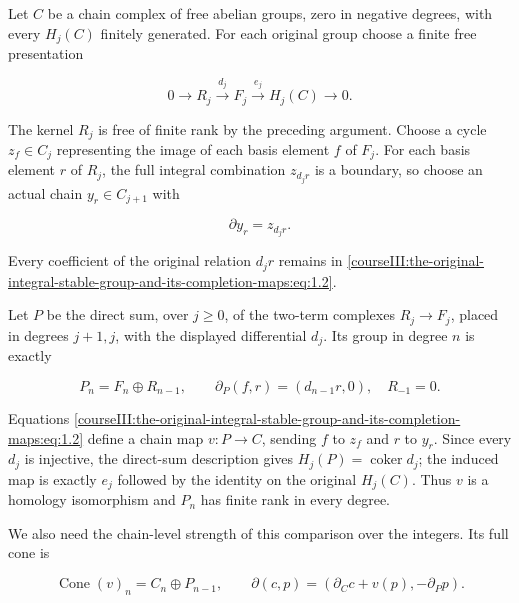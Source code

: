 Let \(C\) be a chain complex of free abelian groups, zero in negative degrees, with every \(H_j(C)\) finitely generated. For each original group choose a finite free presentation

\begin{equation}
0\longrightarrow R_j\xrightarrow{d_j}F_j
 \xrightarrow{e_j}H_j(C)\longrightarrow0.
 \label{courseIII:the-original-integral-stable-group-and-its-completion-maps:eq:1.1}
\end{equation}

The kernel \(R_j\) is free of finite rank by the preceding argument. Choose a cycle \(z_f\in C_j\) representing the image of each basis element \(f\) of \(F_j\). For each basis element \(r\) of \(R_j\), the full integral combination \(z_{d_jr}\) is a boundary, so choose an actual chain \(y_r\in C_{j+1}\) with

\begin{equation}
\partial y_r=z_{d_jr}.
 \label{courseIII:the-original-integral-stable-group-and-its-completion-maps:eq:1.2}
\end{equation}

Every coefficient of the original relation \(d_jr\) remains in \eqref{courseIII:the-original-integral-stable-group-and-its-completion-maps:eq:1.2}.

Let \(P\) be the direct sum, over \(j\geq0\), of the two-term complexes \(R_j\to F_j\), placed in degrees \(j+1,j\), with the displayed differential \(d_j\). Its group in degree \(n\) is exactly

\begin{equation}
P_n=F_n\oplus R_{n-1},\qquad
 \partial_P(f,r)=(d_{n-1}r,0),
 \quad R_{-1}=0.
 \label{courseIII:the-original-integral-stable-group-and-its-completion-maps:eq:1.3}
\end{equation}

Equations \eqref{courseIII:the-original-integral-stable-group-and-its-completion-maps:eq:1.2} define a chain map \(v:P\to C\), sending \(f\) to \(z_f\) and \(r\) to \(y_r\). Since every \(d_j\) is injective, the direct-sum description gives \(H_j(P)=\operatorname{coker}d_j\); the induced map is exactly \(e_j\) followed by the identity on the original \(H_j(C)\). Thus \(v\) is a homology isomorphism and \(P_n\) has finite rank in every degree.

We also need the chain-level strength of this comparison over the integers. Its full cone is

\begin{equation}
\operatorname{Cone}(v)_n=C_n\oplus P_{n-1},\qquad
 \partial(c,p)=(\partial_Cc+v(p),-\partial_Pp).
 \label{courseIII:the-original-integral-stable-group-and-its-completion-maps:eq:1.4}
\end{equation}

